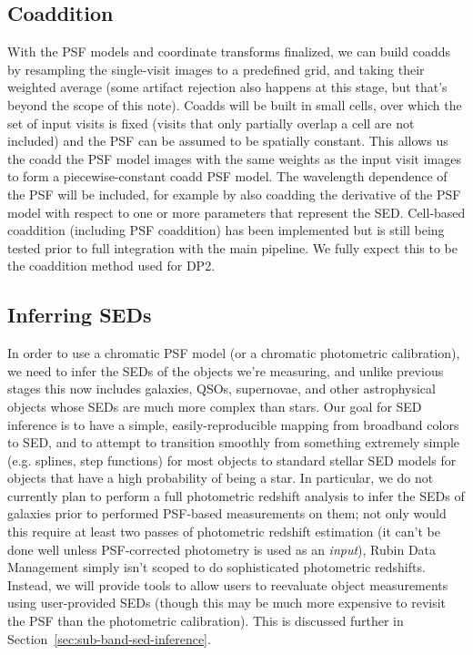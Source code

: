 \documentclass[DM,authoryear,toc]{lsstdoc}
\begin{document}
\subsection{Coaddition}

With the PSF models and coordinate transforms finalized, we can build coadds by resampling the single-visit images to a predefined grid, and taking their weighted average (some artifact rejection also happens at this stage, but that's beyond the scope of this note).
Coadds will be built in small cells, over which the set of input visits is fixed (visits that only partially overlap a cell are not included) and the PSF can be assumed to be spatially constant.
This allows us the coadd the PSF model images with the same weights as the input visit images to form a piecewise-constant coadd PSF model.
The wavelength dependence of the PSF will be included, for example by also coadding the derivative of the PSF model with respect to one or more parameters that represent the SED.
Cell-based coaddition (including PSF coaddition) has been implemented but is still being tested prior to full integration with the main pipeline.
We fully expect this to be the coaddition method used for DP2. 

\subsection{Inferring SEDs}

In order to use a chromatic PSF model (or a chromatic photometric calibration), we need to infer the SEDs of the objects we're measuring, and unlike previous stages this now includes galaxies, QSOs, supernovae, and other astrophysical objects whose SEDs are much more complex than stars.
Our goal for SED inference is to have a simple, easily-reproducible mapping from broadband colors to SED, and to attempt to transition smoothly from something extremely simple (e.g. splines, step functions) for most objects to standard stellar SED models for objects that have a high probability of being a star.
In particular, we do not currently plan to perform a full photometric redshift analysis to infer the SEDs of galaxies prior to performed PSF-based measurements on them; not only would this require at least two passes of photometric redshift estimation (it can't be done well unless PSF-corrected photometry is used as an \emph{input}), Rubin Data Management simply isn't scoped to do sophisticated photometric redshifts.
Instead, we will provide tools to allow users to reevaluate object measurements using user-provided SEDs (though this may be much more expensive to revisit the PSF than the photometric calibration).
This is discussed further in Section~\ref{sec:sub-band-sed-inference}.
\end{document}
